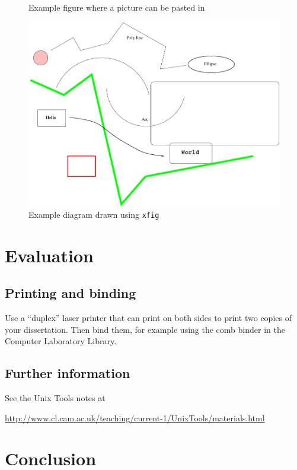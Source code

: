 \documentclass[12pt,a4paper,twoside,openright]{report}
\begin{document}
\begin{figure}[tbh]
\vspace{4in}
\caption{Example figure where a picture can be pasted in}
\label{pastedfig}
\end{figure}


\begin{figure}[tbh]
\centerline{\includegraphics{figs/diagram.pdf}}
\caption{Example diagram drawn using \texttt{xfig}}
\label{xfig}
\end{figure}


\chapter{Evaluation}

\section{Printing and binding}

Use a ``duplex'' laser printer that can print on both sides to print
two copies of your dissertation. Then bind them, for example using the
comb binder in the Computer Laboratory Library.

\section{Further information}

See the Unix Tools notes at

\url{http://www.cl.cam.ac.uk/teaching/current-1/UnixTools/materials.html}


\chapter{Conclusion}
\end{document}
